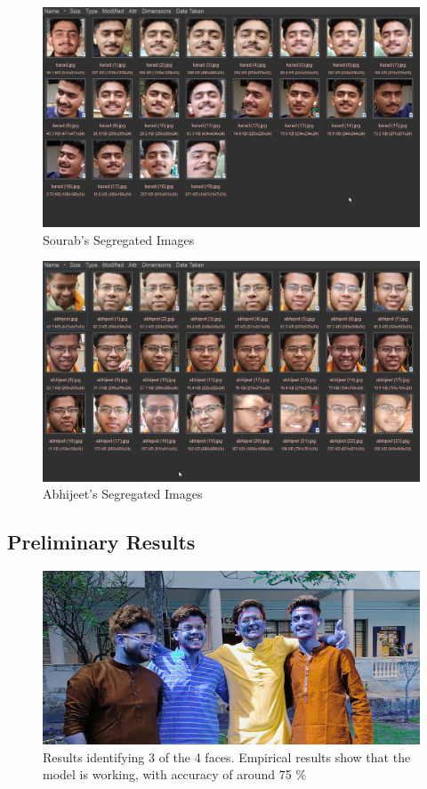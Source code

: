 \documentclass[openany]{report}
\begin{document}
\begin{figure}[H]
    \centering
    \includegraphics[width=.95\textwidth]{imgs/sourab.png}
    \caption{Sourab's Segregated Images}
\end{figure}

\begin{figure}[H]
    \centering
    \includegraphics[width=.95\textwidth]{imgs/abhijeet.png}
    \caption{Abhijeet's Segregated Images}
\end{figure}


\subsection{Preliminary Results}
\begin{figure}[H]
    \centering
    \includegraphics[width=.95\textwidth]{face rec results cropped.jpg}
    \caption{Results identifying 3 of the 4 faces. Empirical results show that the model is working, with accuracy of around 75 \%}
\end{figure}
\end{document}

